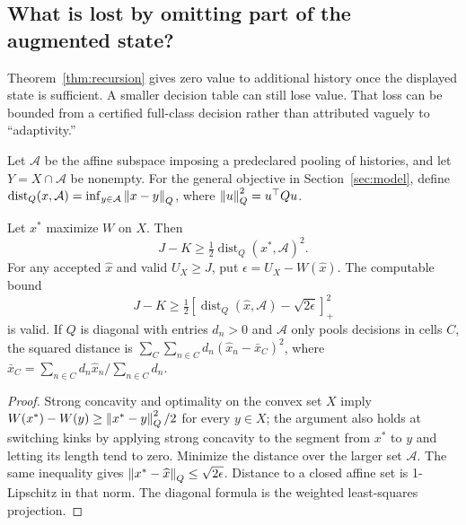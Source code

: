 \subsection{What is lost by omitting part of the augmented state?}\label{sec:omitted-state}
Theorem~\ref{thm:recursion} gives zero value to additional history once the displayed state is sufficient. A smaller decision table can still lose value. That loss can be bounded from a certified full-class decision rather than attributed vaguely to ``adaptivity.''

Let $\mathcal A$ be the affine subspace imposing a predeclared pooling of histories, and let $Y=X\cap\mathcal A$ be nonempty. For the general objective in Section~\ref{sec:model}, define
$\operatorname{dist}_Q(x,\mathcal A)=\inf_{y\in\mathcal A}\left\lVert x-y\right\rVert_Q$, where $\left\lVert u\right\rVert_Q^2=u^\top Q u$.
\begin{proposition}\label{prop:r26-dispersion}
Let $x^*$ maximize $W$ on $X$. Then
\begin{equation}\label{eq:r26-dispersion}
 J-K\geq\tfrac12\operatorname{dist}_Q(x^*,\mathcal A)^2.
\end{equation}
For any accepted $\widehat x$ and valid $U_X\geq J$, put $\epsilon=U_X-W(\widehat x)$. The computable bound
\begin{equation}\label{eq:r26-inexact-dispersion}
 J-K\geq\tfrac12\left[\operatorname{dist}_Q(\widehat x,\mathcal A)
                   -\sqrt{2\epsilon}\right]_+^2
\end{equation}
is valid. If $Q$ is diagonal with entries $d_n>0$ and $\mathcal A$ only pools decisions in cells $C$, the squared distance is
$\sum_C\sum_{n\in C}d_n(\widehat x_n-\bar x_C)^2$, where
$\bar x_C=\sum_{n\in C}d_n\widehat x_n/\sum_{n\in C}d_n$.
\end{proposition}
\begin{proof}
Strong concavity and optimality on the convex set $X$ imply
$W(x^*)-W(y)\geq\left\lVert x^*-y\right\rVert_Q^2/2$ for every $y\in X$; the argument also holds at switching kinks by applying strong concavity to the segment from $x^*$ to $y$ and letting its length tend to zero. Minimize the distance over the larger set $\mathcal A$. The same inequality gives $\left\lVert x^*-\widehat x\right\rVert_Q\leq\sqrt{2\epsilon}$. Distance to a closed affine set is 1-Lipschitz in that norm. The diagonal formula is the weighted least-squares projection.
\end{proof}

